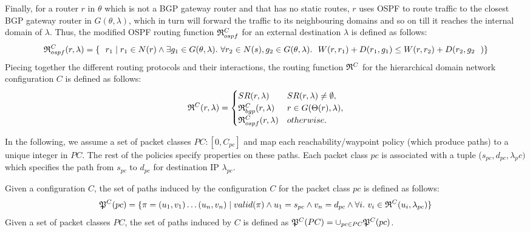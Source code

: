 Finally, for a router $r$ in $\theta$ which is not a BGP gateway 
router and that has no static routes, $r$ uses OSPF to route traffic to the closest BGP
gateway router in $G (\theta, \lambda)$, which in turn will forward  the traffic to its neighbouring domains and so on till it reaches the internal domain of $\lambda$.  Thus, the modified OSPF routing 
function $\mathfrak{R}^C_{ospf}$ for an external destination $\lambda$
is defined as follows: 
\[
\mathfrak{R}_{ospf}^C(r,\lambda) = \{~~r_1 \mid r_1 \in N(r) \wedge \exists g_1 \in G (\theta, \lambda). ~\forall r_2 \in N(s), g_2 \in G (\theta, \lambda). ~~
W(r, r_1) + D(r_1, g_1) \leq
W(r, r_2) + D(r_2, g_2~~)\}
\]
Piecing together the different routing protocols and their 
interactions, the routing function 
$\mathfrak{R}^C$ for the hierarchical domain network configuration $C$ is defined as follows: 
\[
\mathfrak{R}^C(r, \lambda) = 
\begin{cases}
SR(r, \lambda) & SR(r, \lambda) \not= \emptyset, \\
\mathfrak{R}_{bgp}^C(r, \lambda) & r \in G(\Theta(r), \lambda), \\
\mathfrak{R}_{ospf}^C(r, \lambda) & otherwise. 
\end{cases}
\]

In the following, we assume a set of packet classes $PC : [0,C_{pc}]$ 
and map each reachability/waypoint  policy (which produce paths) 
to a unique integer in $PC$. The rest of the policies specify 
properties on these paths. Each packet class $pc$ is associated
with a tuple ($s_{pc}, d_{pc}, \lambda_pc)$ which specifies 
the path from $s_{pc}$ to $d_{pc}$ for destination IP $\lambda_{pc}$.

\begin{definition} \label{def:inducedpaths}
Given a configuration $C$, the set of paths induced
by the configuration $C$ for the packet class $pc$ is defined as follows:
\[
\mathfrak{P}^C(pc) = \{\pi=(u_1, v_1)\ldots (u_n, v_n) \mid 
valid(\pi) \wedge 
u_1 = s_{pc} \wedge v_n= d_{pc} \wedge
\forall i. ~v_i \in \mathfrak{R}^C(u_i,\lambda_{pc})\}
\]
Given a set of packet classes $PC$, the set of paths
 induced by $C$ is defined as
$\mathfrak{P}^C(PC) = \cup_{pc\in PC} \mathfrak{P}^C(pc)$.
\end{definition}

